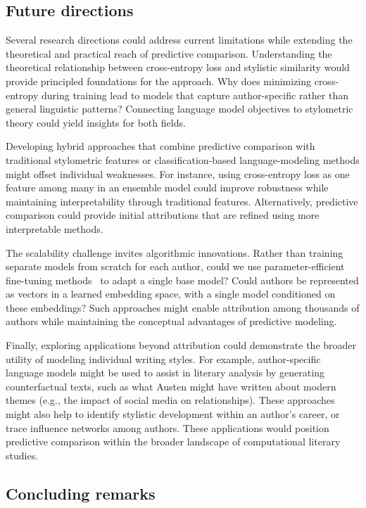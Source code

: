 \documentclass[11pt]{article}
\begin{document}
\subsection{Future directions}

Several research directions could address current limitations while extending
the theoretical and practical reach of predictive comparison. Understanding the
theoretical relationship between cross-entropy loss and stylistic similarity
would provide principled foundations for the approach. Why does minimizing
cross-entropy during training lead to models that capture author-specific
rather than general linguistic patterns? Connecting language model objectives
to stylometric theory could yield insights for both fields.

Developing hybrid approaches that combine predictive comparison with
traditional stylometric features or classification-based language-modeling
methods might offset individual weaknesses. For instance, using cross-entropy
loss as one feature among many in an ensemble model could improve robustness
while maintaining interpretability through traditional features. Alternatively,
predictive comparison could provide initial attributions that are refined using
more interpretable methods.

The scalability challenge invites algorithmic innovations. Rather than training
separate models from scratch for each author, could we use parameter-efficient
fine-tuning methods~\citep{HoulEtal19} to adapt a single base model? Could
authors be represented as vectors in a learned embedding space, with a single
model conditioned on these embeddings? Such approaches might enable attribution
among thousands of authors while maintaining the conceptual advantages of
predictive modeling.

Finally, exploring applications beyond attribution could demonstrate the
broader utility of modeling individual writing styles. For example,
author-specific language models might be used to assist in literary analysis by
generating counterfactual texts, such as what Austen might have written about
modern themes (e.g., the impact of social media on relationships). These
approaches might also help to identify stylistic development within an author's
career, or trace influence networks among authors. These applications would
position predictive comparison within the broader landscape of computational
literary studies.

\subsection{Concluding remarks}
\end{document}
